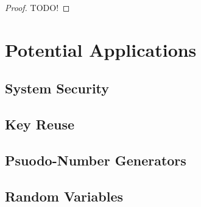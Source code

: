 \documentclass{article}
\newcommand{\1}{\mathsf{\,\#1\,}}
\newcommand{\2}{\mathsf{\,\#2\,}}
\begin{document}
\begin{proof}
TODO!
\end{proof}

\section{Potential Applications}
	\subsection{System Security}
	\subsection{Key Reuse}
	
	\subsection{Psuodo-Number Generators}
	
	\subsection{Random Variables}
\end{document}

